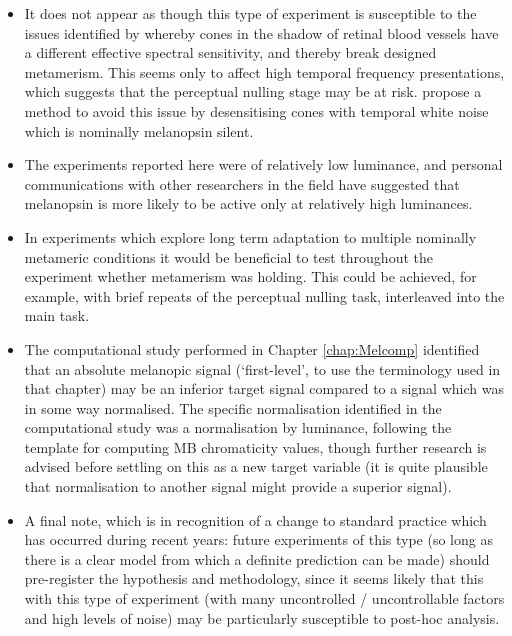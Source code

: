 \begin{itemize}
\item It does not appear as though this type of experiment is susceptible to the issues identified by \citet{spitschan_selective_2015} whereby cones in the shadow of retinal blood vessels have a different effective spectral sensitivity, and thereby break designed metamerism. This seems only to affect high temporal frequency presentations, which suggests that the perceptual nulling stage may be at risk. \citet{zele_melanopsin_2018} propose a method to avoid this issue by desensitising cones with temporal white noise which is nominally melanopsin silent.
\item The experiments reported here were of relatively low luminance, and personal communications with other researchers in the field have suggested that melanopsin is more likely to be active only at relatively high luminances.
\item In experiments which explore long term adaptation to multiple nominally metameric conditions it would be beneficial to test throughout the experiment whether metamerism was holding. This could be achieved, for example, with brief repeats of the perceptual nulling task, interleaved into the main task.
\item The computational study performed in Chapter \ref{chap:Melcomp} identified that an absolute melanopic signal (`first-level', to use the terminology used in that chapter) may be an inferior target signal compared to a signal which was in some way normalised. The specific normalisation identified in the computational study was a normalisation by luminance, following the template for computing \gls{MB} chromaticity values, though further research is advised before settling on this as a new target variable (it is quite plausible that normalisation to another signal might provide a superior signal).
\item A final note, which is in recognition of a change to standard practice which has occurred during recent years: future experiments of this type (so long as there is a clear model from which a definite prediction can be made) should pre-register the hypothesis and methodology, since it seems likely that this with this type of experiment (with many uncontrolled / uncontrollable factors and high levels of noise) may be particularly susceptible to post-hoc analysis.
\end{itemize}





